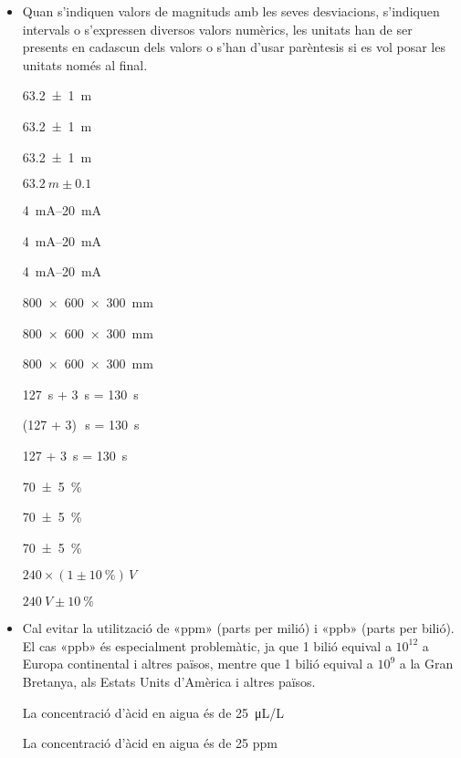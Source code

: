 \begin{itemize}

\item Quan s'indiquen valors de magnituds amb les seves desviacions,
s'indiquen intervals o s'expressen diversos valors numèrics, les
unitats han de ser presents en cadascun dels valors o s'han d'usar
parèntesis si es vol posar les unitats només al final.

\textcolor{Green}\faCheckSquare{} \SI[separate-uncertainty, multi-part-units = repeat]{63,2(1)}{m}

\textcolor{Green}\faCheckSquare{} \SI[separate-uncertainty]{63,2(1)}{m}

\textcolor{Red}\faTimesCircle{} \SI[separate-uncertainty, multi-part-units = single]{63,2(1)}{m}

\textcolor{Red}\faTimesCircle{}  $\SI{63,2}{m} \pm \num{0,1}$


\textcolor{Green}\faCheckSquare{} \SIrange{4}{20}{mA}

\textcolor{Green}\faCheckSquare{} \SIrange[range-units = brackets]{4}{20}{mA}

\textcolor{Red}\faTimesCircle{} \SIrange[range-units = single]{4}{20}{mA}


\textcolor{Green}\faCheckSquare{} \SI{800 x 600 x 300}{mm}

\textcolor{Green}\faCheckSquare{} \SI[product-units = brackets]{800 x 600 x 300}{mm}

\textcolor{Red}\faTimesCircle{} \SI[product-units = single]{800 x 600 x 300}{mm}


\textcolor{Green}\faCheckSquare{} \SI{127}{s} + \SI{3}{s} = \SI{130}{s}

\textcolor{Green}\faCheckSquare{}  (127 + 3)\si{\,s} = \SI{130}{s}

\textcolor{Red}\faTimesCircle{}  127 + \SI{3}{s} = \SI{130}{s}


\textcolor{Green}\faCheckSquare{} \SI[separate-uncertainty, multi-part-units = repeat]{70(5)}{\percent}

\textcolor{Green}\faCheckSquare{} \SI[separate-uncertainty]{70(5)}{\percent}

\textcolor{Red}\faTimesCircle{} \SI[separate-uncertainty, multi-part-units = single]{70(5)}{\percent}


\textcolor{Green}\faCheckSquare{} $240 \times (1 \pm \SI{10}{\percent})\si{\,V}$

\textcolor{Red}\faTimesCircle{}  $\SI{240}{V} \pm \SI{10}{\percent}$


\item Cal evitar la utilització de «ppm» (parts per milió) i «ppb» (parts per bilió). El cas «ppb» és especialment problemàtic, ja que 1 bilió equival a $10^{12}$ a Europa continental i altres països, mentre que 1 bilió equival a $10^{9}$ a la Gran Bretanya, als Estats Units d'Amèrica i altres països.

\textcolor{Green}\faCheckSquare{} La concentració d'àcid en aigua és de \SI{25}{\micro L/L}

\textcolor{Red}\faTimesCircle{} La concentració d'àcid en aigua és de 25 ppm

\end{itemize}


